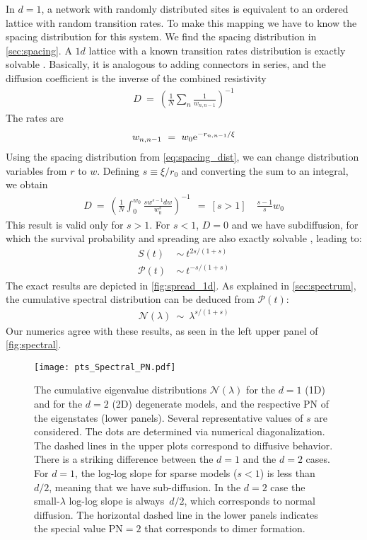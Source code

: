 In $d=1$, a network with randomly distributed sites is equivalent to
an ordered lattice with random transition rates. To make this mapping
we have to know the spacing distribution for this system. We find the
spacing distribution in \autoref{sec:spacing}. A $1d$ lattice with
a known transition rates distribution is exactly solvable \cite{alexander_excitation_1981}.
Basically, it is analogous to adding connectors in series, and 
the diffusion coefficient is the inverse of the combined resistivity
%
\begin{align}
D \ =\ \left(\frac{1}{N} \sum_n \frac{1}{w_{n,n-1}}\right)^{-1}
\end{align}
%
The rates are 
%
\begin{align}
w_{n,n-1} \ =\ w_0 \mbox{e}^{-r_{n,n-1}/\xi}
\end{align}
Using the spacing distribution from \autoref{eq:spacing_dist}, we can change distribution variables
from $r$ to $w$. Defining $s \equiv \xi/r_0$ and converting the sum to an integral, we obtain
%
\begin{align}
D \ =\ \left(\frac{1}{N} \int_0^{w_0} \frac{s w^{s-1}dw}{w_0^s}\right)^{-1} \
\ =\ [s>1]\quad \frac{s-1}{s}w_0
\end{align}
This result is valid only for $s>1$. For $s<1$, $D=0$ and we have
subdiffusion, for which the survival probability and spreading 
are also exactly solvable \cite{alexander_excitation_1981}, leading to:
%
\begin{align}
S(t)           \ &\sim \ t^{2s/(1+s)} \\
\mathcal{P}(t) \ &\sim \ t^{-s/(1+s)}
\end{align}
%
The exact results are depicted in \autoref{fig:spread_1d}. 
As explained in \ref{sec:spectrum}, the cumulative spectral distribution
can be deduced from $\mathcal{P}(t)$:
%
\begin{align}
\mathcal{N}(\lambda) \ \sim\ \lambda^{s/(1+s)}
\end{align}
%
Our numerics agree with these results, as seen in the left upper
panel of \autoref{fig:spectral}.

\begin{figure}
\texttt{[image: pts\_Spectral\_PN.pdf]}

\caption{ 
The cumulative eigenvalue distributions $\mathcal{N}(\lambda)$ 
for the $d{=}1$ (1D) and for the $d{=}2$ (2D) degenerate models, 
and the respective PN of the eigenstates (lower panels).
Several representative values of $s$ are considered.
% 
The dots are determined via numerical diagonalization. 
The dashed lines in the upper plots correspond to diffusive behavior.  
%
There is a striking difference between the $d{=}1$ and the $d{=}2$ cases. 
For $d{=}1$, the log-log slope for sparse models ($s<1$) is less than~$d/2$, 
meaning that we have sub-diffusion. In the $d{=}2$ case the small-$\lambda$ log-log slope 
is always~$d/2$, which corresponds to normal diffusion.
%
The horizontal dashed line in the lower panels indicates 
the special value PN$=2$ that corresponds to dimer formation.
}
\label{fig:spectral}
\end{figure}

